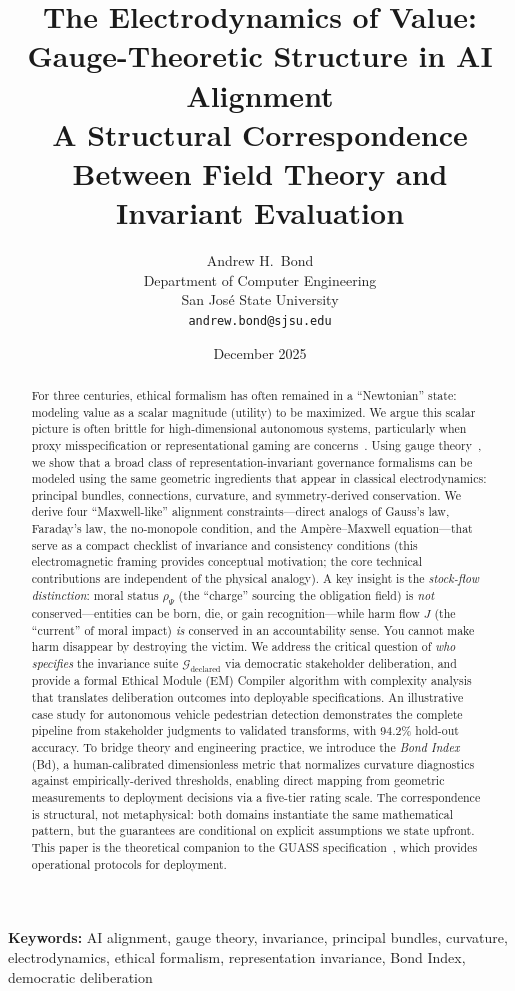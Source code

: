 \documentclass[12pt]{article}
\title{The Electrodynamics of Value:\\
Gauge-Theoretic Structure in AI Alignment\\[0.5em]
\large A Structural Correspondence Between Field Theory and Invariant Evaluation}
\author{Andrew H.\ Bond\\
Department of Computer Engineering\\
San Jos\'{e} State University\\
\texttt{andrew.bond@sjsu.edu}}
\date{December 2025}
\begin{document}
\maketitle

\noindent\textbf{Keywords:} AI alignment, gauge theory, invariance, principal bundles, curvature, electrodynamics, ethical formalism, representation invariance, Bond Index, democratic deliberation

\begin{abstract}
For three centuries, ethical formalism has often remained in a ``Newtonian'' state: modeling
value as a scalar magnitude (utility) to be maximized. We argue this scalar picture is often
brittle for high-dimensional autonomous systems, particularly when proxy misspecification or
representational gaming are concerns~\cite{krakovna2020,hubinger2019}. Using gauge theory~\cite{nakahara2003,bleecker1981}, we show that a broad
class of representation-invariant governance formalisms can be modeled using the same geometric
ingredients that appear in classical electrodynamics: principal bundles, connections, curvature,
and symmetry-derived conservation. We derive four ``Maxwell-like'' alignment constraints---direct analogs of Gauss's law, Faraday's law, the no-monopole condition, and the Amp\`{e}re--Maxwell equation---that serve as a compact checklist of invariance and consistency conditions
(this electromagnetic framing provides conceptual motivation; the core technical contributions
are independent of the physical analogy). A key insight is the \emph{stock-flow distinction}: moral
status $\rho_\Psi$ (the ``charge'' sourcing the obligation field) is \emph{not} conserved---entities can be born,
die, or gain recognition---while harm flow $J$ (the ``current'' of moral impact) \emph{is} conserved in an
accountability sense. You cannot make harm disappear by destroying the victim. We address
the critical question of \emph{who specifies} the invariance suite $\mathcal{G}_{\text{declared}}$ via democratic stakeholder
deliberation, and provide a formal Ethical Module (EM) Compiler algorithm with complexity
analysis that translates deliberation outcomes into deployable specifications. An illustrative
case study for autonomous vehicle pedestrian detection demonstrates the complete pipeline from
stakeholder judgments to validated transforms, with 94.2\% hold-out accuracy. To bridge theory
and engineering practice, we introduce the \emph{Bond Index} (Bd), a human-calibrated dimensionless
metric that normalizes curvature diagnostics against empirically-derived thresholds, enabling
direct mapping from geometric measurements to deployment decisions via a five-tier rating
scale. The correspondence is structural, not metaphysical: both domains instantiate the same
mathematical pattern, but the guarantees are conditional on explicit assumptions we state
upfront. This paper is the theoretical companion to the GUASS specification~\cite{bond2025guass}, which provides
operational protocols for deployment.
\end{abstract}
\end{document}
